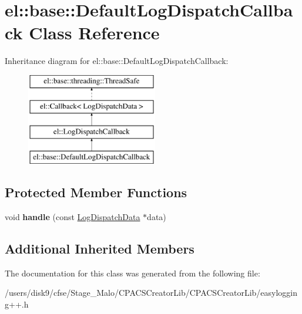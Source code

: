 \hypertarget{classel_1_1base_1_1DefaultLogDispatchCallback}{\section{el\-:\-:base\-:\-:Default\-Log\-Dispatch\-Callback Class Reference}
\label{classel_1_1base_1_1DefaultLogDispatchCallback}
}
Inheritance diagram for el\-:\-:base\-:\-:Default\-Log\-Dispatch\-Callback\-:\begin{figure}[H]
\begin{center}
\leavevmode
\includegraphics[height=4.000000cm]{classel_1_1base_1_1DefaultLogDispatchCallback}
\end{center}
\end{figure}
\subsection*{Protected Member Functions}
\begin{DoxyCompactItemize}
\item 
\hypertarget{classel_1_1base_1_1DefaultLogDispatchCallback_acdac30f202c245500e6d94c55eee6d95}{void {\bfseries handle} (const \hyperlink{classel_1_1LogDispatchData}{Log\-Dispatch\-Data} $\ast$data)}\label{classel_1_1base_1_1DefaultLogDispatchCallback_acdac30f202c245500e6d94c55eee6d95}

\end{DoxyCompactItemize}
\subsection*{Additional Inherited Members}


The documentation for this class was generated from the following file\-:\begin{DoxyCompactItemize}
\item 
/users/disk9/cfse/\-Stage\-\_\-\-Malo/\-C\-P\-A\-C\-S\-Creator\-Lib/\-C\-P\-A\-C\-S\-Creator\-Lib/easylogging++.\-h\end{DoxyCompactItemize}
